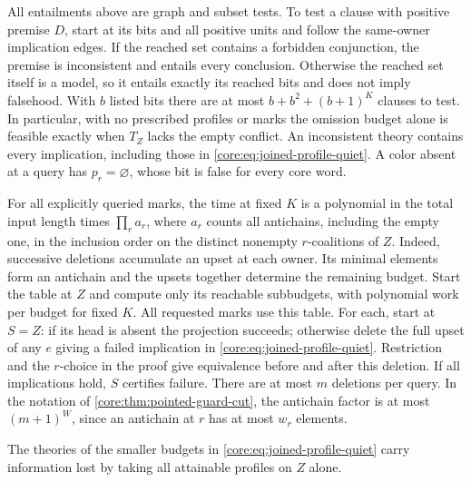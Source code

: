 All entailments above are graph and subset tests. To test a clause
with positive premise $D$, start at its bits and all positive units
and follow the same-owner implication edges. If the reached set
contains a forbidden conjunction, the premise is inconsistent and
entails every conclusion. Otherwise the reached set itself is a
model, so it entails exactly its reached bits and does not imply
falsehood. With $b$ listed bits there are at most
$b+b^2+(b+1)^K$ clauses to test.
In particular, with no prescribed profiles or marks the omission
budget alone is feasible exactly when $T_Z$ lacks the empty conflict.
An inconsistent theory contains every implication, including those
in \eqref{core:eq:joined-profile-quiet}. A color absent at a query
has $p_r=\varnothing$, whose bit is false for every core word.

For all explicitly queried marks, the time at fixed $K$ is a polynomial
in the total input length times $\prod_r a_r$, where $a_r$ counts all
antichains, including the empty one, in the inclusion order on the
distinct nonempty $r$-coalitions of $Z$. Indeed, successive deletions
accumulate an upset at each owner. Its minimal elements form an
antichain and the upsets together determine the remaining budget.
Start the table at $Z$ and compute only its reachable subbudgets,
with polynomial work per budget for fixed $K$. All requested marks
use this table. For each, start at $S=Z$: if its head is absent the
projection succeeds; otherwise delete the full upset of any $e$
giving a failed implication in \eqref{core:eq:joined-profile-quiet}.
Restriction and the $r$-choice in the proof give equivalence before
and after this deletion. If all implications hold, $S$ certifies
failure. There are at most $m$ deletions per query. In the notation
of \cref{core:thm:pointed-guard-cut}, the antichain factor is at most
$(m+1)^W$, since an antichain at $r$ has at most $w_r$ elements.

The theories of the smaller budgets in \eqref{core:eq:joined-profile-quiet}
carry information lost by taking all attainable profiles on $Z$ alone.

